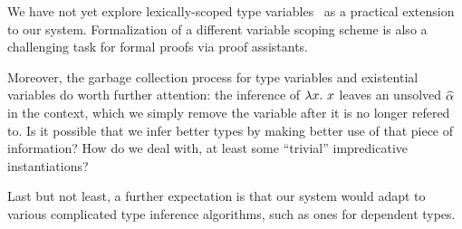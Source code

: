 We have not yet explore lexically-scoped type variables~\cite{jones2003lexically}
as a practical extension to our system.
Formalization of a different variable scoping scheme is also
a challenging task for formal proofs via proof assistants.

Moreover, the garbage collection process for type variables and
existential variables do worth further attention:
the inference of $\lam x$ leaves an unsolved $\al$ in the context,
which we simply remove the variable after it is no longer refered to.
Is it possible that we infer better types by making better use of that piece of information?
How do we deal with, at least some ``trivial'' impredicative instantiations?

Last but not least, a further expectation is that our system would
adapt to various complicated type inference algorithms,
such as ones for dependent types.
